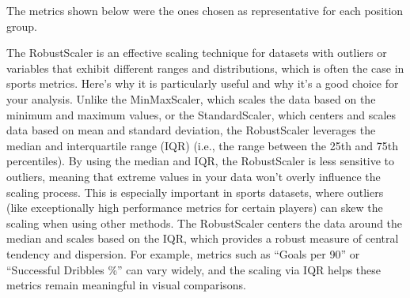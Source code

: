 \documentclass[11pt]{article}
\makeatletter
\newcommand{\boxspacing}{\kern\kvtcb@left@rule\kern\kvtcb@boxsep}
\newcommand{\prompt}[4]{
        {\ttfamily\llap{{\color{#2}[#3]:\hspace{3pt}#4}}\vspace{-\baselineskip}}
    }
\makeatother
\begin{document}
    The metrics shown below were the ones chosen as representative for each
position group.

    The RobustScaler is an effective scaling technique for datasets with
outliers or variables that exhibit different ranges and distributions,
which is often the case in sports metrics. Here's why it is particularly
useful and why it's a good choice for your analysis. Unlike the
MinMaxScaler, which scales the data based on the minimum and maximum
values, or the StandardScaler, which centers and scales data based on
mean and standard deviation, the RobustScaler leverages the median and
interquartile range (IQR) (i.e., the range between the 25th and 75th
percentiles). By using the median and IQR, the RobustScaler is less
sensitive to outliers, meaning that extreme values in your data won't
overly influence the scaling process. This is especially important in
sports datasets, where outliers (like exceptionally high performance
metrics for certain players) can skew the scaling when using other
methods. The RobustScaler centers the data around the median and scales
based on the IQR, which provides a robust measure of central tendency
and dispersion. For example, metrics such as ``Goals per 90'' or
``Successful Dribbles \%'' can vary widely, and the scaling via IQR
helps these metrics remain meaningful in visual comparisons.

    \begin{tcolorbox}[breakable, size=fbox, boxrule=1pt, pad at break*=1mm,colback=cellbackground, colframe=cellborder]
\prompt{In}{incolor}{43}{\boxspacing}
\begin{Verbatim}[commandchars=\\\{\}]

\end{Verbatim}
\end{tcolorbox}
\end{document}
